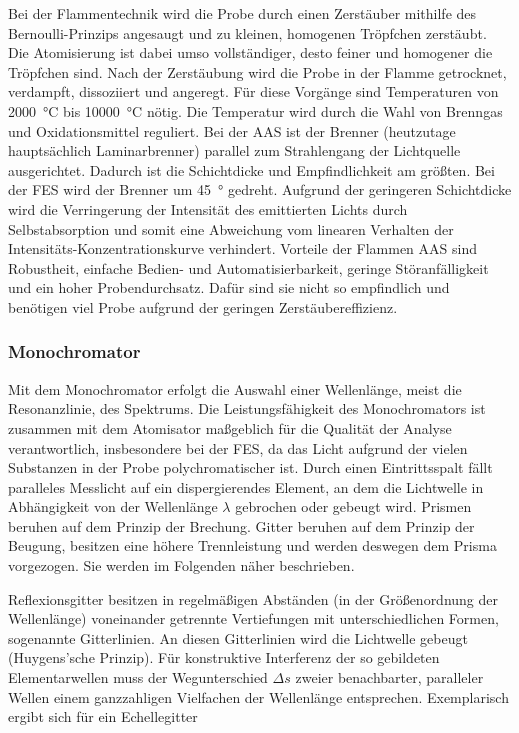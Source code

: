       Bei der Flammentechnik wird die Probe durch einen Zerstäuber mithilfe des Bernoulli-Prinzips angesaugt und zu kleinen, homogenen Tröpfchen zerstäubt. Die Atomisierung ist dabei umso vollständiger, desto feiner und homogener die Tröpfchen sind. Nach der Zerstäubung wird die Probe in der Flamme getrocknet, verdampft, dissoziiert und angeregt. Für diese Vorgänge sind Temperaturen von \SI[mode=text]{2000}{\degreeCelsius} bis \SI[mode=text]{10000}{\degreeCelsius} nötig. Die Temperatur wird durch die Wahl von Brenngas und Oxidationsmittel reguliert. Bei der AAS ist der Brenner (heutzutage hauptsächlich Laminarbrenner) parallel zum Strahlengang der Lichtquelle ausgerichtet. Dadurch ist die Schichtdicke und Empfindlichkeit am größten. Bei der FES wird der Brenner um \SI[mode=text]{45}{\degree} gedreht. Aufgrund der geringeren Schichtdicke wird die Verringerung der Intensität des emittierten Lichts durch Selbstabsorption und somit eine Abweichung vom linearen Verhalten der Intensitäts-Konzentrationskurve verhindert. Vorteile der Flammen AAS sind Robustheit, einfache Bedien- und Automatisierbarkeit, geringe Störanfälligkeit und ein hoher Probendurchsatz.  Dafür sind sie nicht so empfindlich und benötigen viel Probe aufgrund der geringen Zerstäubereffizienz. \citep{AnalytikIII}
        
    \subsubsection{Monochromator}
      
      Mit dem Monochromator erfolgt die Auswahl einer Wellenlänge, meist die Resonanzlinie, des Spektrums. Die Leistungsfähigkeit des Monochromators ist zusammen mit dem Atomisator maßgeblich für die Qualität der Analyse verantwortlich, insbesondere bei der FES, da das Licht aufgrund der vielen Substanzen in der Probe polychromatischer ist. Durch einen Eintrittsspalt fällt paralleles Messlicht auf ein dispergierendes Element, an dem die Lichtwelle in Abhängigkeit von der Wellenlänge $\lambda$ gebrochen oder gebeugt wird. Prismen beruhen auf dem Prinzip der Brechung. Gitter beruhen auf dem Prinzip der Beugung, besitzen eine höhere Trennleistung und werden deswegen dem Prisma vorgezogen. Sie werden im Folgenden näher beschrieben.
      
      Reflexionsgitter besitzen in regelmäßigen Abständen (in der Größenordnung der Wellenlänge) voneinander getrennte Vertiefungen mit unterschiedlichen Formen, sogenannte Gitterlinien. An diesen Gitterlinien wird die Lichtwelle gebeugt (Huygens'sche Prinzip). Für konstruktive Interferenz der so gebildeten Elementarwellen muss der Wegunterschied $\Delta s$ zweier benachbarter, paralleler Wellen einem ganzzahligen Vielfachen der Wellenlänge entsprechen. Exemplarisch ergibt sich für ein Echellegitter
      
